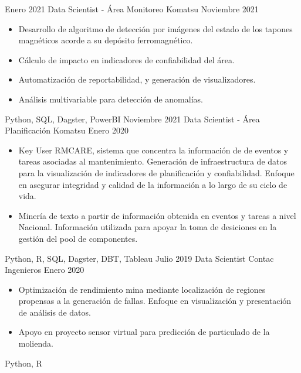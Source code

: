 \begin{experiences}
    \experience
        {Enero 2021}
        {Data Scientist - Área Monitoreo}
        {Komatsu}
        {Noviembre 2021}
        {
            \begin{itemize}
            \item Desarrollo de algoritmo de detección por imágenes del estado de los tapones magnéticos acorde a su depósito ferromagnético.
            \item Cálculo de impacto en indicadores de confiabilidad del área.
            \item Automatización de reportabilidad, y generación de visualizadores.
            \item Análisis multivariable para detección de anomalías.
            \end{itemize}
        }
        {
            Python,
            SQL,
            Dagster,
            PowerBI
        }
    \experience
    {Noviembre 2021}
    {Data Scientist - Área Planificación}
    {Komatsu}
    {Enero 2020}
    {
        \begin{itemize}
            \item Key User RMCARE, sistema que concentra la información de de eventos y tareas asociadas al mantenimiento.
            Generación de infraestructura de datos para la visualización de indicadores de planificación y confiabilidad.
            Enfoque en asegurar integridad y calidad de la información a lo largo de su ciclo de vida.
            \item Minería de texto a partir de información obtenida en eventos y tareas a nivel Nacional.
            Información utilizada para apoyar la toma de desiciones en la gestión del pool de componentes.
        \end{itemize}
    }
    {
        Python,
        R,
        SQL,
        Dagster,
        DBT,
        Tableau
    }
        \experience
        {Julio 2019}
        {Data Scientist}
        {Contac Ingenieros}
        {Enero 2020}
        {
            \begin{itemize}
                \item Optimización de rendimiento mina mediante localización de regiones propensas a la generación de fallas. Enfoque en visualización y presentación de análisis de datos.
                \item Apoyo en proyecto sensor virtual para predicción de particulado de la molienda.
            \end{itemize}
        }
        {
            Python,
            R
        }


  

\end{experiences}
